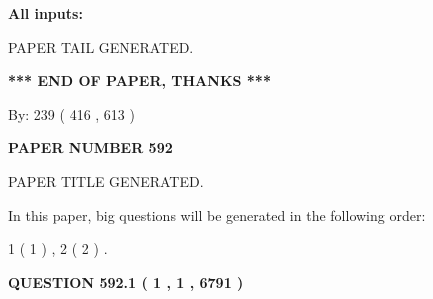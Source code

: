 \documentclass[12pt]{article}
\begin{document}
   
   
   
\noindent{}
   
   
   
   
\noindent\vspace{0.1in}\hspace{-0.08in} {\textbf{\Large{All inputs: }}}
   
   
   
   
   
   
 \vspace{0.2in}
 
   
   
\vspace{2.0in} PAPER TAIL GENERATED.
   
   
   
   
\vspace{1.0in} 
{\textbf{\large{ *** END OF PAPER, THANKS *** }}} 
   
   
\hspace{1.0in} By: 
 239 ( 416 ,  613 )
   
   
   
   
\newpage 
\setcounter{page}{ 
   592001 } 
   
   
   
   
 {\textbf{ \Large{ PAPER NUMBER  592  }}}
   
   
\vspace{0.2in}
   
   
   
   
   
   
   
   
 \vspace{0.2in}
 
 
 
 
   
   
 PAPER TITLE GENERATED.
   
   
   
\vspace{0.2in}
   
In this paper, big questions will be generated in the following order: 
   
   
   1 ( 1 )
 ,
   2 ( 2 )
 .
  
\vspace{0.2in}
  
{\textbf{\Large{QUESTION
592.1 
 ( 1 , 1 , 6791 )
}}}
  
\end{document}
